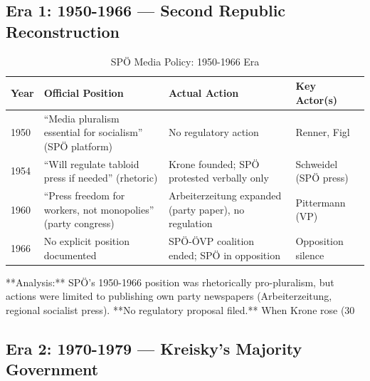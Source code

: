 \subsection*{Era 1: 1950-1966 --- Second Republic Reconstruction}

\begin{table}[h]
\centering
\small
\caption{SPÖ Media Policy: 1950-1966 Era}
\label{tab:bh-media-policy-1950-1966}
\begin{tabular}{|p{2.5cm}|p{3cm}|p{3cm}|p{4cm}|}
\hline
\textbf{Year} & \textbf{Official Position} & \textbf{Actual Action} & \textbf{Key Actor(s)} \\
\hline
1950 & ``Media pluralism essential for socialism'' (SPÖ platform) & No regulatory action & Renner, Figl \\
\hline
1954 & ``Will regulate tabloid press if needed'' (rhetoric) & Krone founded; SPÖ protested verbally only & Schweidel (SPÖ press) \\
\hline
1960 & ``Press freedom for workers, not monopolies'' (party congress) & Arbeiterzeitung expanded (party paper), no regulation & Pittermann (VP) \\
\hline
1966 & No explicit position documented & SPÖ-ÖVP coalition ended; SPÖ in opposition & Opposition silence \\
\hline
\end{tabular}
\end{table}

**Analysis:** SPÖ's 1950-1966 position was rhetorically pro-pluralism, but actions were limited to publishing own party newspapers
(Arbeiterzeitung, regional socialist press). **No regulatory proposal filed.** When Krone rose (30%

\subsection*{Era 2: 1970-1979 --- Kreisky's Majority Government}

